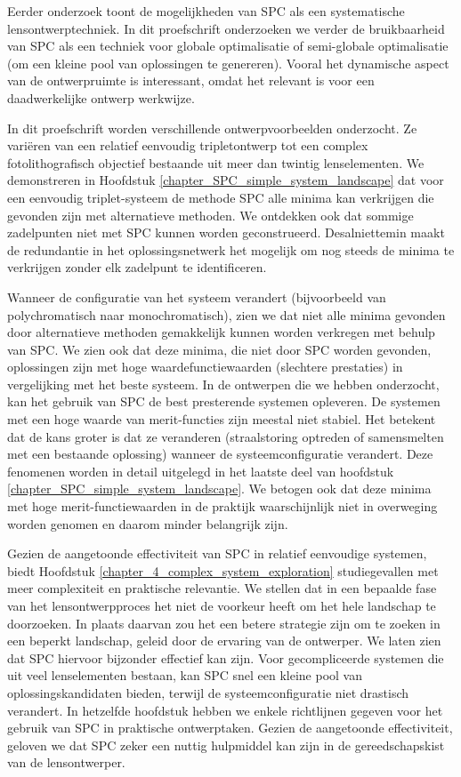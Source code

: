 {%
Eerder onderzoek toont de mogelijkheden van SPC als een systematische lensontwerptechniek. In dit proefschrift onderzoeken we verder de bruikbaarheid van SPC als een techniek voor globale optimalisatie of semi-globale optimalisatie (om een kleine pool van oplossingen te genereren). Vooral het dynamische aspect van de ontwerpruimte is interessant, omdat het relevant is voor een daadwerkelijke ontwerp werkwijze.

In dit proefschrift worden verschillende ontwerpvoorbeelden onderzocht. Ze variëren van een relatief eenvoudig tripletontwerp tot een complex fotolithografisch objectief bestaande uit meer dan twintig lenselementen. We demonstreren in Hoofdstuk \ref{chapter_SPC_simple_system_landscape} dat voor een eenvoudig triplet-systeem de methode SPC alle minima kan verkrijgen die gevonden zijn met alternatieve methoden. We ontdekken ook dat sommige zadelpunten niet met SPC kunnen worden geconstrueerd. Desalniettemin maakt de redundantie in het oplossingsnetwerk het mogelijk om nog steeds de minima te verkrijgen zonder elk zadelpunt te identificeren.

Wanneer de configuratie van het systeem verandert (bijvoorbeeld van polychromatisch naar monochromatisch), zien we dat niet alle minima gevonden door alternatieve methoden gemakkelijk kunnen worden verkregen met behulp van SPC. We zien ook dat deze minima, die niet door SPC worden gevonden, oplossingen zijn met hoge waardefunctiewaarden (slechtere prestaties) in vergelijking met het beste systeem. In de ontwerpen die we hebben onderzocht, kan het gebruik van SPC de best presterende systemen opleveren. De systemen met een hoge waarde van merit-functies zijn meestal niet stabiel. Het betekent dat de kans groter is dat ze veranderen (straalstoring optreden of samensmelten met een bestaande oplossing) wanneer de systeemconfiguratie verandert. Deze fenomenen worden in detail uitgelegd in het laatste deel van hoofdstuk \ref{chapter_SPC_simple_system_landscape}. We betogen ook dat deze minima met hoge merit-functiewaarden in de praktijk waarschijnlijk niet in overweging worden genomen en daarom minder belangrijk zijn.

Gezien de aangetoonde effectiviteit van SPC in relatief eenvoudige systemen, biedt Hoofdstuk \ref{chapter_4_complex_system_exploration} studiegevallen met meer complexiteit en praktische relevantie. We stellen dat in een bepaalde fase van het lensontwerpproces het niet de voorkeur heeft om het hele landschap te doorzoeken. In plaats daarvan zou het een betere strategie zijn om te zoeken in een beperkt landschap, geleid door de ervaring van de ontwerper. We laten zien dat SPC hiervoor bijzonder effectief kan zijn. Voor gecompliceerde systemen die uit veel lenselementen bestaan, kan SPC snel een kleine pool van oplossingskandidaten bieden, terwijl de systeemconfiguratie niet drastisch verandert. In hetzelfde hoofdstuk hebben we enkele richtlijnen gegeven voor het gebruik van SPC in praktische ontwerptaken. Gezien de aangetoonde effectiviteit, geloven we dat SPC zeker een nuttig hulpmiddel kan zijn in de gereedschapskist van de lensontwerper.

}

